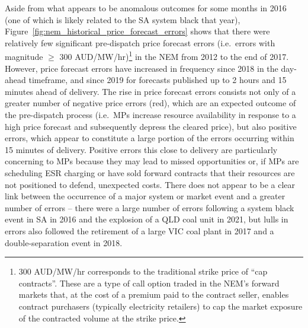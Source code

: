 \documentclass[12pt,a4paper,]{report}
\begin{document}
Aside from what appears to be anomalous outcomes for some months in 2016
(one of which is likely related to the SA system black that year),
Figure~\ref{fig:nem_historical_price_forecast_errors} shows that there
were relatively few significant pre-dispatch price forecast errors
(i.e.~errors with magnitude \(\geq\) 300 AUD/MW/hr)\footnote{300
  AUD/MW/hr corresponds to the traditional strike price of ``cap
  contracts''. These are a type of call option traded in the NEM's
  forward markets that, at the cost of a premium paid to the contract
  seller, enables contract purchasers (typically electricity retailers)
  to cap the market exposure of the contracted volume at the strike
  price.} in the NEM from 2012 to the end of 2017. However, price
forecast errors have increased in frequency since 2018 in the day-ahead
timeframe, and since 2019 for forecasts published up to 2 hours and 15
minutes ahead of delivery. The rise in price forecast errors consists
not only of a greater number of negative price errors (red), which are
an expected outcome of the pre-dispatch process (i.e.~MPs increase
resource availability in response to a high price forecast and
subsequently depress the cleared price), but also positive errors, which
appear to constitute a large portion of the errors occurring within 15
minutes of delivery. Positive errors this close to delivery are
particularly concerning to MPs because they may lead to missed
opportunities or, if MPs are scheduling ESR charging or have sold
forward contracts that their resources are not positioned to defend,
unexpected costs. There does not appear to be a clear link between the
occurrence of a major system or market event and a greater number of
errors -- there were a large number of errors following a system black
event in SA in 2016 and the explosion of a QLD coal unit in 2021, but
lulls in errors also followed the retirement of a large VIC coal plant
in 2017 and a double-separation event in 2018.
\end{document}
